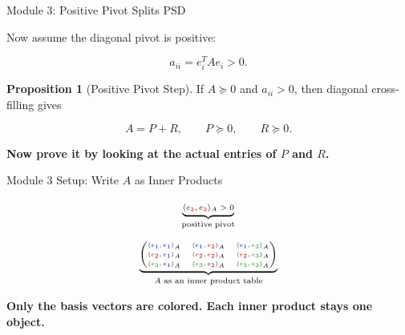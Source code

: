 \documentclass[10pt]{beamer}
\theoremstyle{definition}
\newtheorem{prop}{Proposition}[section]
\newcommand{\x}[1]{\alert{\textbf{#1}}}
\newcommand{\rd}[1]{{\color{red!70!black}#1}}
\newcommand{\bl}[1]{{\color{blue!70!black}#1}}
\newcommand{\gn}[1]{{\color{green!60!black}#1}}
\begin{document}
\begin{frame}{Module 3: Positive Pivot Splits PSD}

Now assume the diagonal pivot is positive:

$$
a_{ii}=e_i^TAe_i>0.
$$

\vfill

\begin{prop}[Positive Pivot Step]
If $A\succeq0$ and $a_{ii}>0$, then diagonal cross-filling gives

$$
A=P+R,\qquad P\succeq0,\qquad R\succeq0.
$$

\end{prop}

\vfill

\begin{center}
\x{Now prove it by looking at the actual entries of $P$ and $R$.}
\end{center}

\end{frame}



\begin{frame}[shrink=8]{Module 3 Setup: Write $A$ as Inner Products}

\[
\scriptsize
\underbrace{\langle \rd{e_2},\rd{e_2}\rangle_A>0}_{\text{positive pivot}}
\]

\vfill

\[
\tiny
\underbrace{
\begin{pmatrix}
\langle \bl{e_1},\bl{e_1}\rangle_A&\langle \bl{e_1},\rd{e_2}\rangle_A&\langle \bl{e_1},\gn{e_3}\rangle_A\\[0.35em]
\langle \rd{e_2},\bl{e_1}\rangle_A&\langle \rd{e_2},\rd{e_2}\rangle_A&\langle \rd{e_2},\gn{e_3}\rangle_A\\[0.35em]
\langle \gn{e_3},\bl{e_1}\rangle_A&\langle \gn{e_3},\rd{e_2}\rangle_A&\langle \gn{e_3},\gn{e_3}\rangle_A
\end{pmatrix}}_{A\text{ as an inner product table}}
\]

\vfill

\begin{center}
\x{Only the basis vectors are colored. Each inner product stays one object.}
\end{center}

\end{frame}
\end{document}
